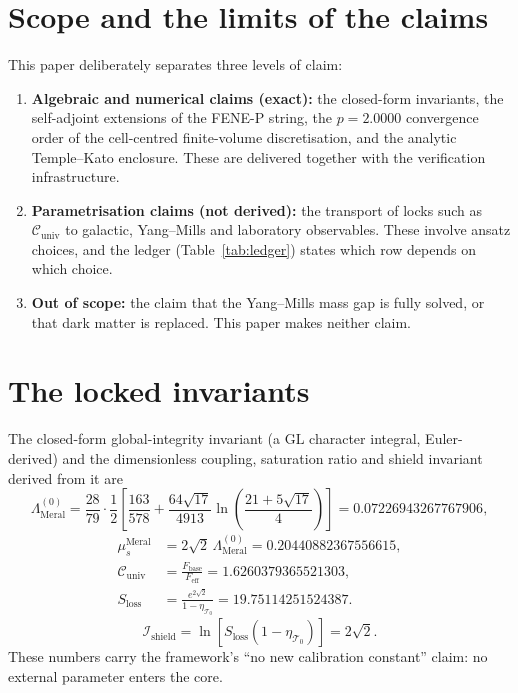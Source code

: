 \documentclass[12pt,a4paper]{article}
\begin{document}
\section{Scope and the limits of the claims}
This paper deliberately separates three levels of claim:
\begin{enumerate}
    \item \textbf{Algebraic and numerical claims (exact):} the closed-form
    invariants, the self-adjoint extensions of the FENE-P string, the
    $p = 2.0000$ convergence order of the cell-centred finite-volume
    discretisation, and the analytic Temple--Kato enclosure. These are
    delivered together with the verification infrastructure.
    \item \textbf{Parametrisation claims (not derived):} the transport of
    locks such as $\mathcal{C}_{\mathrm{univ}}$ to galactic, Yang--Mills
    and laboratory observables. These involve ansatz choices, and the ledger
    (Table~\ref{tab:ledger}) states which row depends on which choice.
    \item \textbf{Out of scope:} the claim that the Yang--Mills mass gap is
    fully solved, or that dark matter is replaced. This paper makes neither
    claim.
\end{enumerate}

\section{The locked invariants}
The closed-form global-integrity invariant (a $\mathrm{GL}$ character
integral, Euler-derived) and the dimensionless coupling, saturation ratio
and shield invariant derived from it are
\begin{equation}
\label{eq:core}
\Lambda_{\mathrm{Meral}}^{(0)} = \frac{28}{79}\cdot\frac{1}{2}
\left[\frac{163}{578} + \frac{64\sqrt{17}}{4913}
\ln\!\left(\frac{21+5\sqrt{17}}{4}\right)\right] = 0.07226943267767906,
\end{equation}
\begin{equation}
\label{eq:core2}
\begin{split}
\mu_s^{\mathrm{Meral}} &= 2\sqrt{2}\,\Lambda_{\mathrm{Meral}}^{(0)}
= 0.20440882367556615, \\
\mathcal{C}_{\mathrm{univ}} &= \frac{F_{\mathrm{base}}}{F_{\mathrm{eff}}}
= 1.6260379365521303, \\
S_{\mathrm{loss}} &= \frac{e^{2\sqrt{2}}}{1-\eta_{\mathcal{T}_0}}
= 19.75114251524387.
\end{split}
\end{equation}
\begin{equation}
\label{eq:core3}
\mathcal{I}_{\mathrm{shield}} = \ln\!\left[S_{\mathrm{loss}}(1-\eta_{\mathcal{T}_0})\right] = 2\sqrt{2}.
\end{equation}
These numbers carry the framework's ``no new calibration constant'' claim:
no external parameter enters the core.
\end{document}
